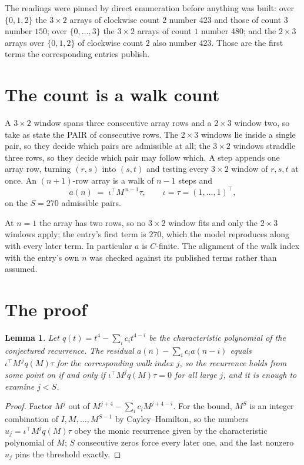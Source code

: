 \documentclass[11pt,a4paper]{article}
\theoremstyle{plain}
\newtheorem{lemma}[theorem]{Lemma}
\theoremstyle{definition}
\begin{document}
The readings were pinned by direct enumeration before anything was built: over
$\{0,1,2\}$ the $3\times2$ arrays of clockwise count $2$ number $423$ and those of count
$3$ number $150$; over $\{0,\dots,3\}$ the $3\times2$ arrays of count $1$ number $480$;
and the $2\times3$ arrays over $\{0,1,2\}$ of clockwise count $2$ also number $423$. Those
are the first terms the corresponding entries publish.

\section{The count is a walk count}

A $3\times2$ window spans three consecutive array rows and a $2\times3$
window two, so take as state the PAIR of consecutive rows. The $2\times3$ windows lie inside a
single pair, so they decide which pairs are admissible at all; the $3\times2$ windows straddle
three rows, so they decide which pair may follow which. A step appends one array row, turning
$(r,s)$ into $(s,t)$ and testing every $3\times2$ window of $r,s,t$ at once. An $(n+1)$-row
array is a walk of $n-1$ steps and
\[
a(n)\;=\;\iota^{\!\top}M^{\,n-1}\tau,\qquad\iota=\tau=(1,\dots,1)^{\!\top},
\]
on the $S=270$ admissible pairs.

At $n=1$ the array has two rows, so no $3\times2$ window fits and only the
$2\times3$ windows apply; the entry's first term is
$270$, which the model reproduces along with every later term.
In particular $a$ is $C$-finite. The alignment of the walk index with the entry's own $n$ was
checked against its published terms rather than assumed.

\section{The proof}

\begin{lemma}\label{lem:crit}
Let $q(t)=t^{4}-\sum_i c_it^{4-i}$ be the characteristic polynomial of the
conjectured recurrence. The residual $a(n)-\sum_ic_ia(n-i)$ equals
$\iota^{\!\top}M^{\,j}q(M)\tau$ for the corresponding walk index $j$, so the recurrence
holds from some point on if and only if $\iota^{\!\top}M^{j}q(M)\tau=0$ for all large $j$,
and it is enough to examine $j<S$.
\end{lemma}

\begin{proof}
Factor $M^{j}$ out of $M^{j+4}-\sum_ic_iM^{j+4-i}$. For the bound, $M^{S}$
is an integer combination of $I,M,\dots,M^{S-1}$ by Cayley--Hamilton, so the numbers
$u_j=\iota^{\!\top}M^{j}q(M)\tau$ obey the monic recurrence given by the characteristic
polynomial of $M$; $S$ consecutive zeros force every later one, and the last nonzero $u_j$
pins the threshold exactly.
\end{proof}
\end{document}
